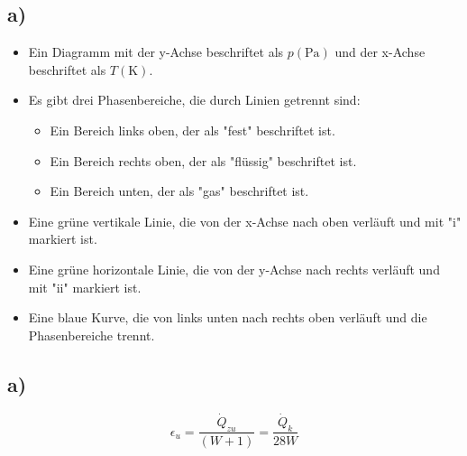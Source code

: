 

\subsection*{a)}

\begin{itemize}
    \item Ein Diagramm mit der y-Achse beschriftet als $p(\text{Pa})$ und der x-Achse beschriftet als $T(\text{K})$. 
    \item Es gibt drei Phasenbereiche, die durch Linien getrennt sind:
    \begin{itemize}
        \item Ein Bereich links oben, der als "fest" beschriftet ist.
        \item Ein Bereich rechts oben, der als "flüssig" beschriftet ist.
        \item Ein Bereich unten, der als "gas" beschriftet ist.
    \end{itemize}
    \item Eine grüne vertikale Linie, die von der x-Achse nach oben verläuft und mit "i" markiert ist.
    \item Eine grüne horizontale Linie, die von der y-Achse nach rechts verläuft und mit "ii" markiert ist.
    \item Eine blaue Kurve, die von links unten nach rechts oben verläuft und die Phasenbereiche trennt.
\end{itemize}



\subsection*{a)}
\begin{equation*}
    \epsilon_u = \frac{\dot{Q}_{zu}}{(W+1)} = \frac{\dot{Q}_k}{28W}
\end{equation*}